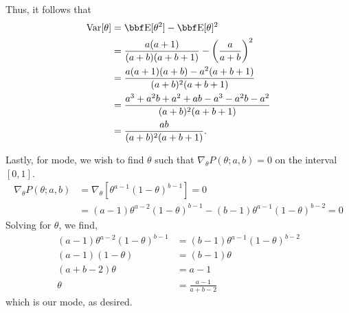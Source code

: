 \documentclass[12pt,letterpaper,fleqn]{hmcpset}
\begin{document}
\begin{solution}
Thus, it follows that
\begin{align*}
\text{Var}[\theta] &= \EE[\theta^2] - \EE[\theta]^2 \\
&= \frac{a(a + 1)}{(a + b)(a + b + 1)} - \left(\frac{a}{a + b}\right)^2 \\
&= \frac{a(a + 1)(a + b) - a^2(a + b + 1)}{(a + b)^2(a + b + 1)} \\
&= \frac{a^3 + a^2b + a^2 + ab - a^3 - a^2b - a^2}{(a + b)^2(a + b + 1)} \\
&= \frac{ab}{(a + b)^2(a + b + 1)}.
\end{align*}

Lastly, for mode, we wish to find $\theta$ such that $\nabla_{\theta} P(\theta; a, b) = 0$ on the interval $[0, 1]$.
\begin{align*}
\nabla_{\theta}P(\theta; a, b) &= \nabla_{\theta} \left[ \theta^{a-1}(1 - \theta)^{b-1} \right] = 0 \\
&= (a - 1)\theta^{a-2}(1 - \theta)^{b-1} - (b - 1)\theta^{a-1}(1 - \theta)^{b-2} = 0
\end{align*}
Solving for $\theta$, we find,
\begin{align*}
(a - 1)\theta^{a-2}(1 - \theta)^{b-1} &= (b - 1)\theta^{a-1}(1 - \theta)^{b-2} \\
(a - 1)(1 - \theta) &= (b - 1)\theta \\
(a + b - 2)\theta &= a - 1 \\
\theta &= \frac{a - 1}{a + b - 2}
\end{align*}
which is our mode, as desired.
\end{solution}
\newpage
\end{document}
